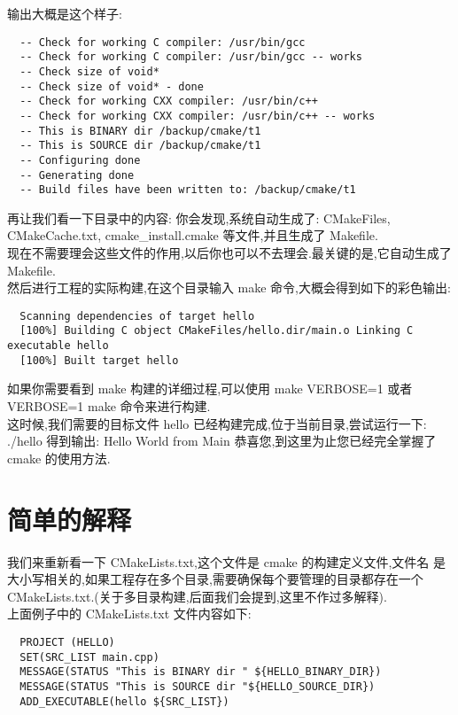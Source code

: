 \documentclass[oneside, 12pt]{book}
\begin{document}
输出大概是这个样子:
\begin{verbatim}
  -- Check for working C compiler: /usr/bin/gcc
  -- Check for working C compiler: /usr/bin/gcc -- works
  -- Check size of void*
  -- Check size of void* - done
  -- Check for working CXX compiler: /usr/bin/c++
  -- Check for working CXX compiler: /usr/bin/c++ -- works
  -- This is BINARY dir /backup/cmake/t1
  -- This is SOURCE dir /backup/cmake/t1
  -- Configuring done
  -- Generating done
  -- Build files have been written to: /backup/cmake/t1
\end{verbatim}
再让我们看一下目录中的内容: 你会发现,系统自动生成了: CMakeFiles, CMakeCache.txt, cmake\_install.cmake 等文件,并且生成了 Makefile.\\
现在不需要理会这些文件的作用,以后你也可以不去理会.最关键的是,它自动生成了 Makefile.\\
然后进行工程的实际构建,在这个目录输入 make 命令,大概会得到如下的彩色输出:
\begin{verbatim}
  Scanning dependencies of target hello 
  [100%] Building C object CMakeFiles/hello.dir/main.o Linking C executable hello 
  [100%] Built target hello
\end{verbatim}
如果你需要看到 make 构建的详细过程,可以使用 make VERBOSE=1 或者 VERBOSE=1 make 命令来进行构建.\\
这时候,我们需要的目标文件 hello 已经构建完成,位于当前目录,尝试运行一下: ./hello 得到输出: Hello World from Main 恭喜您,到这里为止您已经完全掌握了 cmake 的使用方法.
\section{简单的解释}
我们来重新看一下 CMakeLists.txt,这个文件是 cmake 的构建定义文件,文件名 是大小写相关的,如果工程存在多个目录,需要确保每个要管理的目录都存在一个 CMakeLists.txt.(关于多目录构建,后面我们会提到,这里不作过多解释).\\
上面例子中的 CMakeLists.txt 文件内容如下:
\begin{verbatim}
  PROJECT (HELLO) 
  SET(SRC_LIST main.cpp) 
  MESSAGE(STATUS "This is BINARY dir " ${HELLO_BINARY_DIR}) 
  MESSAGE(STATUS "This is SOURCE dir "${HELLO_SOURCE_DIR}) 
  ADD_EXECUTABLE(hello ${SRC_LIST})
\end{verbatim}
\end{document}
